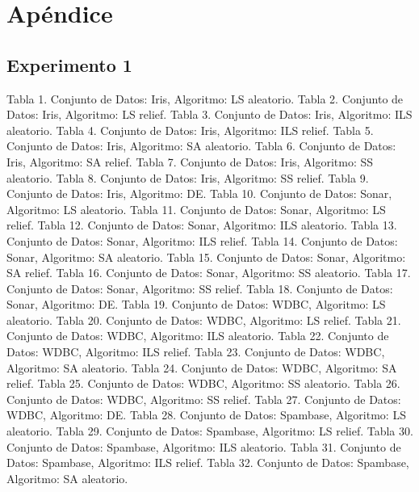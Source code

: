\documentclass{ci5652}
\begin{document}

\newpage
\section*{Apéndice}

\subsection*{Experimento 1}

Tabla 1. Conjunto de Datos: Iris, Algoritmo: LS aleatorio.
Tabla 2. Conjunto de Datos: Iris, Algoritmo: LS relief.
Tabla 3. Conjunto de Datos: Iris, Algoritmo: ILS aleatorio.
Tabla 4. Conjunto de Datos: Iris, Algoritmo: ILS relief.
Tabla 5. Conjunto de Datos: Iris, Algoritmo: SA aleatorio.
Tabla 6. Conjunto de Datos: Iris, Algoritmo: SA relief.
Tabla 7. Conjunto de Datos: Iris, Algoritmo: SS aleatorio.
Tabla 8. Conjunto de Datos: Iris, Algoritmo: SS relief.
Tabla 9. Conjunto de Datos: Iris, Algoritmo: DE.
Tabla 10. Conjunto de Datos: Sonar, Algoritmo: LS aleatorio.
Tabla 11. Conjunto de Datos: Sonar, Algoritmo: LS relief.
Tabla 12. Conjunto de Datos: Sonar, Algoritmo: ILS aleatorio.
Tabla 13. Conjunto de Datos: Sonar, Algoritmo: ILS relief.
Tabla 14. Conjunto de Datos: Sonar, Algoritmo: SA aleatorio.
Tabla 15. Conjunto de Datos: Sonar, Algoritmo: SA relief.
Tabla 16. Conjunto de Datos: Sonar, Algoritmo: SS aleatorio.
Tabla 17. Conjunto de Datos: Sonar, Algoritmo: SS relief.
Tabla 18. Conjunto de Datos: Sonar, Algoritmo: DE.
Tabla 19. Conjunto de Datos: WDBC, Algoritmo: LS aleatorio.
Tabla 20. Conjunto de Datos: WDBC, Algoritmo: LS relief.
Tabla 21. Conjunto de Datos: WDBC, Algoritmo: ILS aleatorio.
Tabla 22. Conjunto de Datos: WDBC, Algoritmo: ILS relief.
Tabla 23. Conjunto de Datos: WDBC, Algoritmo: SA aleatorio.
Tabla 24. Conjunto de Datos: WDBC, Algoritmo: SA relief.
Tabla 25. Conjunto de Datos: WDBC, Algoritmo: SS aleatorio.
Tabla 26. Conjunto de Datos: WDBC, Algoritmo: SS relief.
Tabla 27. Conjunto de Datos: WDBC, Algoritmo: DE.
Tabla 28. Conjunto de Datos: Spambase, Algoritmo: LS aleatorio.
Tabla 29. Conjunto de Datos: Spambase, Algoritmo: LS relief.
Tabla 30. Conjunto de Datos: Spambase, Algoritmo: ILS aleatorio.
Tabla 31. Conjunto de Datos: Spambase, Algoritmo: ILS relief.
Tabla 32. Conjunto de Datos: Spambase, Algoritmo: SA aleatorio.
\end{document}
